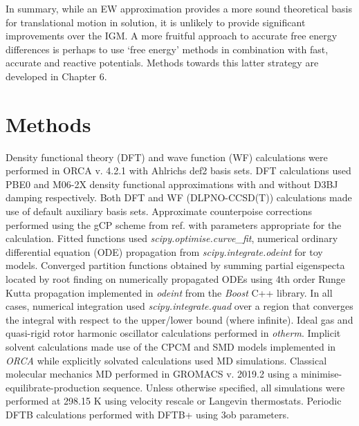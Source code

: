 \documentclass[../main.tex]{subfiles}
\begin{document}
In summary, while an EW approximation provides a more sound theoretical basis for translational motion in solution, it is unlikely to provide significant improvements over the IGM. A more fruitful approach to accurate free energy differences is perhaps to use `free energy' methods in combination with fast, accurate and reactive potentials. Methods towards this latter strategy are developed in Chapter 6.

\section{Methods}

Density functional theory (DFT) and wave function (WF) calculations were performed in ORCA v. 4.2.1 with Ahlrichs def2 basis sets\cite{Weigend2005}. DFT calculations used PBE0\cite{Adamo1999, Perdew1996} and M06-2X\cite{Zhao2007} density functional approximations with and without D3BJ\cite{Grimme2010, Grimme2011} damping respectively. Both DFT and WF (DLPNO-CCSD(T)\cite{Riplinger2013}) calculations made use of default auxiliary basis sets. Approximate counterpoise corrections performed using the gCP scheme from ref. \cite{Kruse2012} with parameters appropriate for the calculation. Fitted functions used \emph{scipy.optimise.curve\_fit}, numerical ordinary differential equation (ODE) propagation from  \emph{scipy.integrate.odeint} for toy models.\cite{SciPy} Converged partition functions obtained by summing partial eigenspecta located by root finding on numerically propagated ODEs using 4th order Runge Kutta\cite{Kutta1901} propagation implemented in \emph{odeint} from the \emph{Boost} C++ library.\cite{BoostODE2021} In all cases, numerical integration used \emph{scipy.integrate.quad} over a region that converges the integral with respect to the upper/lower bound (where infinite). Ideal gas and quasi-rigid rotor harmonic oscillator calculations performed in \emph{otherm}. Implicit solvent calculations made use of the CPCM\cite{Barone1998} and SMD\cite{Marenich2009} models implemented in \emph{ORCA} while explicitly solvated calculations used MD simulations. Classical molecular mechanics MD performed in GROMACS v. 2019.2 using a minimise-equilibrate-production sequence.\cite{Abraham2015} Unless otherwise specified, all simulations were performed at 298.15 K using velocity rescale or Langevin thermostats. Periodic DFTB calculations performed with DFTB+\cite{Hourahine2020} using 3ob\cite{Gaus2012} parameters.

\clearpage
\end{document}

